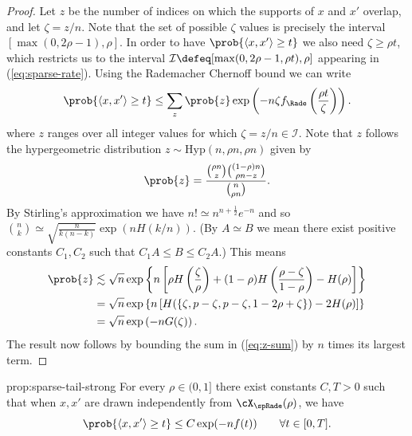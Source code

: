 \documentclass{article}
\begin{document}
\begin{proof}
Let $z$ be the number of indices on which the supports of $x$ and $x'$ overlap, and let $\zeta = z/n$. Note that the set of possible $\zeta$ values is precisely the interval $[\max(0,2\rho-1),\rho]$. In order to have $\prob{\langle x,x' \rangle \ge t}$ we also need $\zeta \ge \rho t$, which restricts us to the interval $\mathcal{I} \defeq [\max(0,2\rho-1,\rho t),\rho]$ appearing in (\ref{eq:sparse-rate}). Using the Rademacher Chernoff bound we can write
\begin{equation}
\label{eq:z-sum}
\prob{\langle x,x' \rangle \ge t} \le \sum_z \prob{z} \exp\left(-n \zeta f_\Rade\left(\frac{\rho t}{\zeta}\right)\right).
\end{equation}
where $z$ ranges over all integer values for which $\zeta = z/n \in \mathcal{I}$. Note that $z$ follows the hypergeometric distribution $z \sim \mathrm{Hyp}(n,\rho n,\rho n)$ given by
$$\prob{z} = \frac{\binom{\rho n}{z} \binom{(1-\rho)n}{\rho n-z}}{\binom{n}{\rho n}}.$$
By Stirling's approximation we have $n! \simeq n^{n+\frac{1}{2}}e^{-n}$ and so $\binom{n}{k} \simeq \sqrt{\frac{n}{k(n-k)}} \exp(n H(k/n))$. (By $A \simeq B$ we mean there exist positive constants $C_1,C_2$ such that $C_1 A \le B \le C_2 A$.) This means
\begin{align*}
\prob{z} &\lesssim \sqrt{n} \exp\left\{n\left[\rho H\left(\frac{\zeta}{\rho}\right) + (1-\rho)H\left(\frac{\rho-\zeta}{1-\rho}\right) - H(\rho)\right]\right\} \\
&= \sqrt{n} \exp\left\{n\left[H(\{\zeta,p-\zeta,p-\zeta,1-2\rho+\zeta\}) - 2H(\rho)\right]\right\} \\
&= \sqrt{n} \exp\left(-n G(\zeta)\right).
\end{align*}
The result now follows by bounding the sum in (\ref{eq:z-sum}) by $n$ times its largest term.
\end{proof}



\begin{repproposition}{prop:sparse-tail-strong}
For every $\rho \in (0,1]$ there exist constants $C,T > 0$ such that when $x,x'$ are drawn independently from $\cX_\spRade(\rho)$, we have
$$\prob{\langle x,x' \rangle \ge t} \le C \exp(-n f(t)) \qquad \forall t \in [0,T].$$
\end{repproposition}
\end{document}
